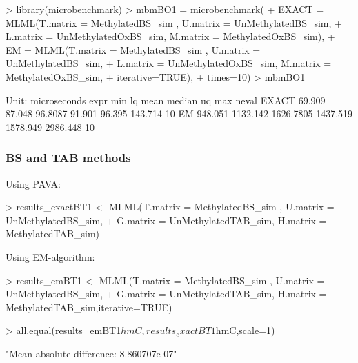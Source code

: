 \documentclass{article}
\begin{document}
\begin{Schunk}
\begin{Sinput}
>  library(microbenchmark)
>  mbmBO1 = microbenchmark(
+     EXACT = MLML(T.matrix = MethylatedBS_sim , U.matrix = UnMethylatedBS_sim,
+                  L.matrix = UnMethylatedOxBS_sim, M.matrix = MethylatedOxBS_sim),
+     EM =    MLML(T.matrix = MethylatedBS_sim , U.matrix = UnMethylatedBS_sim,
+                  L.matrix = UnMethylatedOxBS_sim, M.matrix = MethylatedOxBS_sim,
+                  iterative=TRUE),
+     times=10)
>  mbmBO1
\end{Sinput}
\begin{Soutput}
Unit: microseconds
  expr     min       lq      mean   median       uq      max neval
 EXACT  69.909   87.048   96.8087   91.901   96.395  143.714    10
    EM 948.051 1132.142 1626.7805 1437.519 1578.949 2986.448    10
\end{Soutput}
\end{Schunk}


\subsubsection{BS and TAB methods}

Using PAVA:
\begin{Schunk}
\begin{Sinput}
> results_exactBT1 <- MLML(T.matrix = MethylatedBS_sim , U.matrix = UnMethylatedBS_sim,
+ G.matrix = UnMethylatedTAB_sim, H.matrix = MethylatedTAB_sim)
\end{Sinput}
\end{Schunk}

Using EM-algorithm:
\begin{Schunk}
\begin{Sinput}
>  results_emBT1 <- MLML(T.matrix = MethylatedBS_sim , U.matrix = UnMethylatedBS_sim,
+  G.matrix = UnMethylatedTAB_sim, H.matrix = MethylatedTAB_sim,iterative=TRUE)
\end{Sinput}
\end{Schunk}


\begin{Schunk}
\begin{Sinput}
>  all.equal(results_emBT1$hmC,results_exactBT1$hmC,scale=1)
\end{Sinput}
\begin{Soutput}
[1] "Mean absolute difference: 8.860707e-07"
\end{Soutput}
\end{Schunk}
\end{document}
